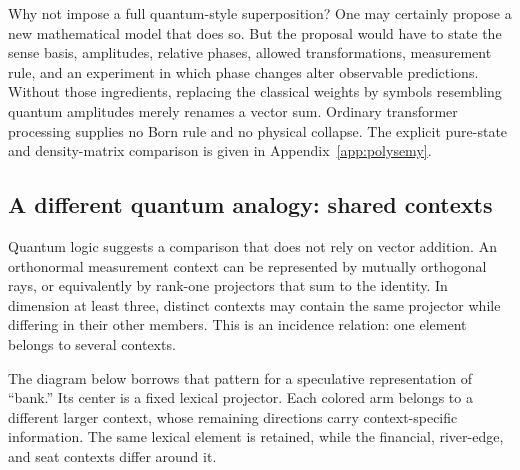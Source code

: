 \documentclass[
  aps,
  reprint,
  superscriptaddress,
  floatfix,
  nofootinbib,
  longbibliography
]{revtex4-2}
\begin{document}
Why not impose a full quantum-style superposition?  One may certainly propose
a new mathematical model that does so.  But the proposal would have to state
the sense basis, amplitudes, relative phases, allowed transformations,
measurement rule, and an experiment in which phase changes alter observable
predictions.  Without those ingredients, replacing the classical weights by
symbols resembling quantum amplitudes merely renames a vector sum.  Ordinary
transformer processing supplies no Born rule and no physical collapse.  The
explicit pure-state and density-matrix comparison is given in
Appendix~\ref{app:polysemy}.

\subsection{A different quantum analogy: shared contexts}

Quantum logic suggests a comparison that does not rely on vector addition.
An orthonormal measurement context can be represented by mutually orthogonal
rays, or equivalently by rank-one projectors that sum to the identity.  In
dimension at least three, distinct contexts may contain the same projector
while differing in their other members.  This is an incidence relation: one
element belongs to several contexts.

The diagram below borrows that pattern for a speculative representation of
``bank.''  Its center is a fixed lexical projector.  Each colored arm belongs
to a different larger context, whose remaining directions carry
context-specific information.  The same lexical element is retained, while
the financial, river-edge, and seat contexts differ around it.
\end{document}
